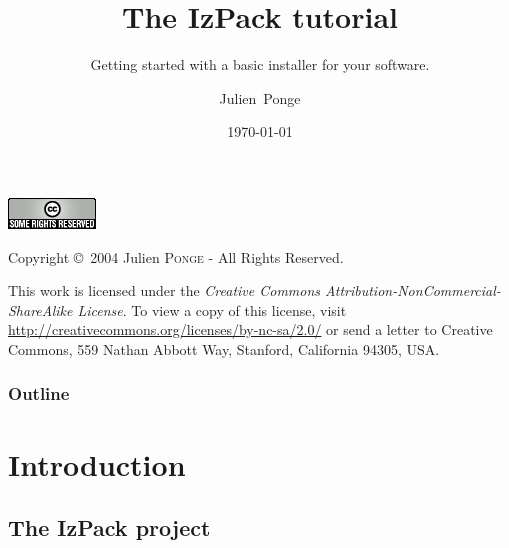 \documentclass{beamer}
\title{The IzPack tutorial}
\subtitle{Getting started with a basic installer for your software.}
\author{Julien~Ponge\inst{1}}
\institute
{
  \inst{1}%
  \texttt{<julien@izforge.com>}\\
  \url{http://www.izforge.com/}\\
  IzPack project founder and current maintainer.
}
\date{\today}
\begin{document}

\begin{frame}
  \titlepage
\end{frame}


\begin{frame}[plain]

\href{http://www.creativecommons.org/}{\includegraphics[scale=0.5]{cc}}

\vspace{2em}

Copyright \copyright~2004 Julien \textsc{Ponge} - All Rights Reserved.

\vspace{2em}

This work is licensed under the \textit{Creative Commons
Attribution-NonCommercial-ShareAlike License}. To view a copy of this license,
visit
\href{http://creativecommons.org/licenses/by-nc-sa/2.0/}{\small\url{http://creativecommons.org/licenses/by-nc-sa/2.0/}}
or send a letter to Creative Commons, 559 Nathan Abbott Way, Stanford,
California 94305, USA.

\end{frame}


\begin{frame}
  \frametitle{Outline}
  \tableofcontents
\end{frame}


\section{Introduction}


\subsection{The IzPack project}

\end{document}
